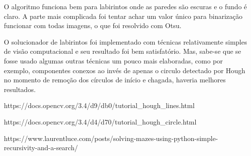 \documentclass[conference]{IEEEtran}
\begin{document}
O algoritmo funciona bem para labirintos onde as paredes são escuras e o fundo é claro. A parte mais complicada foi tentar achar um valor único para binarização funcionar com todas imagens, o que foi resolvido com Otsu.

O solucionador de labirintos foi implementado com técnicas relativamente simples de visão computacional e seu resultado foi bem satisfatório. Mas, sabe-se que se fosse usado algumas outras técnicas um pouco mais elaboradas, como por exemplo, componentes conexos ao invés de apenas o circulo detectado por Hough no momento de remoção dos círculos de início e chagada, haveria melhores resultados.


\begin{thebibliography}{00}
 https://docs.opencv.org/3.4/d9/db0/tutorial_hough_lines.html

 https://docs.opencv.org/3.4/d4/d70/tutorial_hough_circle.html

 https://www.laurentluce.com/posts/solving-mazes-using-python-simple-recursivity-and-a-search/
\end{thebibliography}
\end{document}
